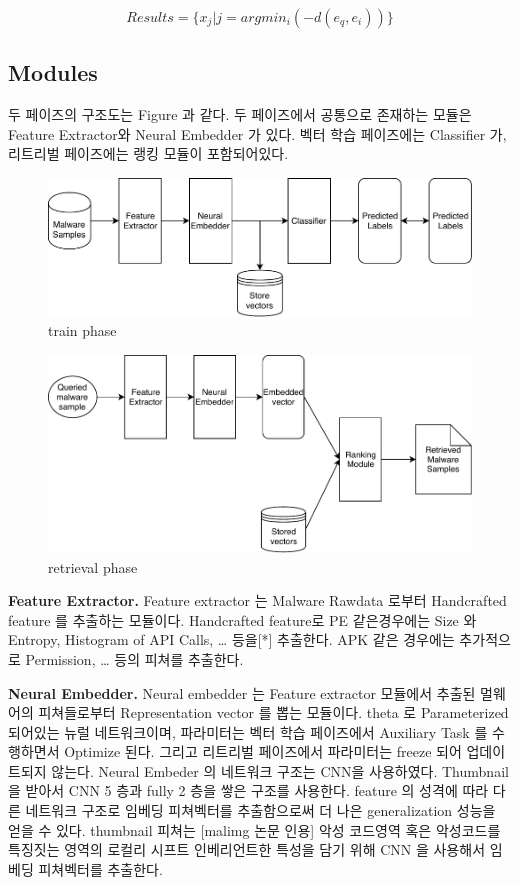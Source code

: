 \[
Results = \{x_j | j = argmin_i( {-d(e_q, e_i)} )  \}
\]


\subsection{Modules}
두 페이즈의 구조도는 Figure 과 같다. 두 페이즈에서 공통으로 존재하는 모듈은 Feature Extractor와 Neural Embedder 가 있다. 벡터 학습 페이즈에는 Classifier 가, 리트리벌 페이즈에는 랭킹 모듈이 포함되어있다. 

\begin{figure}[!htb] %
  \includegraphics[width=\linewidth]{../figures/train_phase.pdf}
  \caption{train phase}
  \label{fig:train_phase}
\end{figure}

\begin{figure}[!htb] %
  \includegraphics[width=\linewidth]{../figures/retrieval_phase.pdf}
  \caption{retrieval phase}
  \label{fig:retrieval_phase}
\end{figure}

\textbf{Feature Extractor. }
Feature extractor 는 Malware Rawdata 로부터 Handcrafted feature 를 추출하는 모듈이다. Handcrafted feature로 PE 같은경우에는 Size 와 Entropy, Histogram of API Calls, … 등을[*] 추출한다. APK 같은 경우에는 추가적으로 Permission,  … 등의 피쳐를 추출한다. 

\textbf{Neural Embedder. }
Neural embedder 는 Feature extractor 모듈에서 추출된 멀웨어의 피쳐들로부터 Representation vector 를 뽑는 모듈이다. theta 로 Parameterized 되어있는 뉴럴 네트워크이며, 파라미터는 벡터 학습 페이즈에서 Auxiliary Task 를 수행하면서 Optimize 된다. 그리고 리트리벌 페이즈에서 파라미터는 freeze 되어 업데이트되지 않는다. 
Neural Embeder 의 네트워크 구조는 CNN을 사용하였다. Thumbnail 을 받아서 CNN 5 층과 fully 2 층을 쌓은 구조를 사용한다. feature 의 성격에 따라 다른 네트워크 구조로 임베딩 피쳐벡터를 추출함으로써 더 나은 generalization 성능을 얻을 수 있다. thumbnail 피쳐는 [malimg 논문 인용] 악성 코드영역 혹은 악성코드를 특징짓는 영역의 로컬리 시프트 인베리언트한 특성을 담기 위해 CNN 을 사용해서 임베딩 피쳐벡터를 추출한다. 

